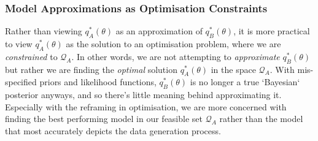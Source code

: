 \documentclass[twoside,11pt]{article}
\newcommand{\KLD}{\operatorname{KLD}}
\DeclareMathOperator*{\argmin}{arg\,min}
\begin{document}
\subsubsection{Model Approximations as Optimisation Constraints}
Rather than viewing $q_A^*(\theta)$ as an approximation of $q_B^*(\theta)$, it is more practical to view $q_A^*(\theta)$ as the solution to an optimisation problem, where we are \textit{constrained} to $\mathcal{Q}_{A}$. In other words, we are not attempting to \textit{approximate} $q_B^*(\theta)$ but rather we are finding the \textit{optimal} solution $q_A^*(\theta)$ in the space $\mathcal{Q}_{A}$. With mis-specified priors and likelihood functions, $q_B^*(\theta)$  is no longer a true `Bayesian` posterior anyways, and so there's little meaning behind approximating it. Especially with the reframing in optimisation, we are more concerned with finding the best performing model in our feasible set $\mathcal{Q}_{A}$ rather than the model that most accurately depicts the data generation process.


\end{document}
